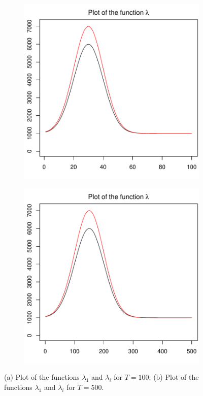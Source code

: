 \documentclass[a4paper,12pt]{article}
\numberwithin{equation}{section}
\begin{document}
\begin{figure}[t!]
\centering
\begin{subfigure}[b]{0.475\textwidth}
\includegraphics[width=\textwidth]{plots/lambda_fcts_different_heights_100}
\caption{}
\end{subfigure}\hspace{0.25cm}
\begin{subfigure}[b]{0.475\textwidth}
\includegraphics[width=\textwidth]{plots/lambda_fcts_different_heights_500}
\caption{}
\end{subfigure}
\caption{(a) Plot of the functions $\lambda_1$ and $\lambda_i$ for $T = 100$; (b) Plot of the functions $\lambda_1$ and $\lambda_i$ for $T = 500$.}
\end{figure}
\end{document}
